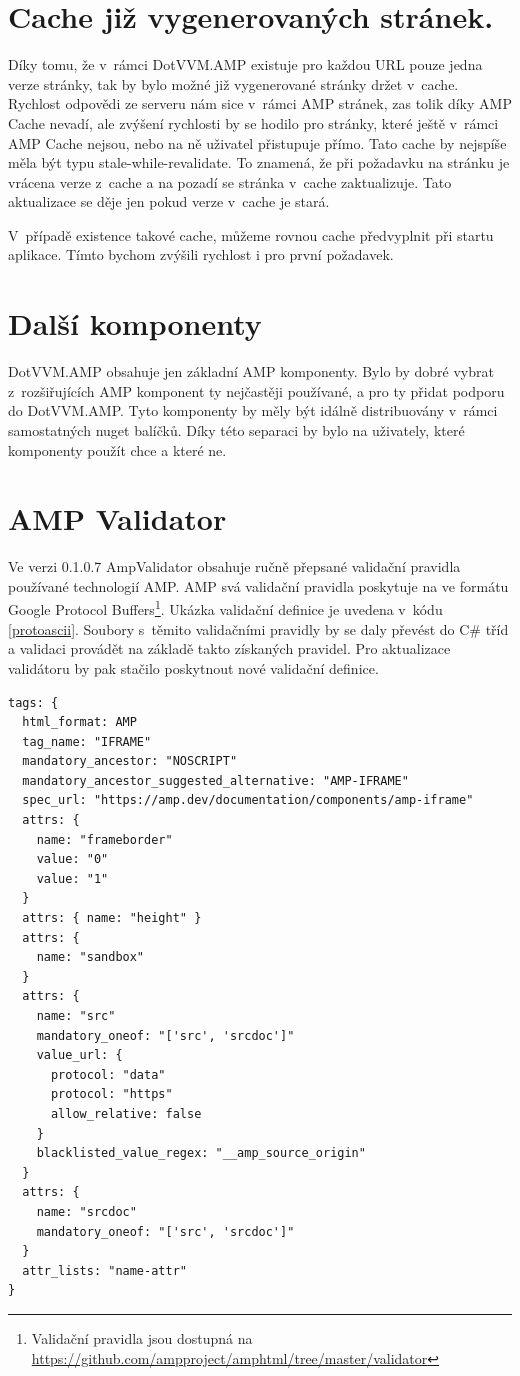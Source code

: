\section{Cache již vygenerovaných stránek.}
Díky tomu, že v~rámci DotVVM.AMP existuje pro každou URL pouze jedna verze stránky, tak by bylo možné již vygenerované stránky držet v~cache. Rychlost odpovědi ze serveru nám sice v~rámci AMP stránek, zas tolik díky AMP Cache nevadí, ale zvýšení rychlosti by se hodilo pro stránky, které ještě v~rámci AMP Cache nejsou, nebo na ně uživatel přistupuje přímo.
Tato cache by nejspíše měla být typu stale-while-revalidate. To znamená, že při požadavku na stránku je vrácena verze z~cache a na pozadí se stránka v~cache zaktualizuje. Tato aktualizace se děje jen pokud verze v~cache je stará.

V~případě existence takové cache, můžeme rovnou cache předvyplnit při startu aplikace. Tímto bychom zvýšili rychlost i pro první požadavek.

\section{Další komponenty}
DotVVM.AMP obsahuje jen základní AMP komponenty. Bylo by dobré vybrat z~rozšiřujících AMP komponent ty nejčastěji používané, a pro ty přidat podporu do DotVVM.AMP. Tyto komponenty by měly být idálně distribuovány v~rámci samostatných nuget balíčků. Díky této separaci by bylo na uživately, které komponenty použít chce a které ne.


\section{AMP Validator}
Ve verzi 0.1.0.7 AmpValidator obsahuje ručně přepsané validační pravidla používané technologií AMP. AMP svá validační pravidla poskytuje na ve formátu Google Protocol Buffers\footnote{Validační pravidla jsou dostupná na \url{https://github.com/ampproject/amphtml/tree/master/validator}}. Ukázka validační definice je uvedena v~kódu \ref{protoascii}\cite{validatorGit}.  Soubory s~těmito validačními pravidly by se daly převést do C\# tříd a validaci provádět na základě takto získaných pravidel. Pro aktualizace validátoru by pak stačilo poskytnout nové validační definice.

\begin{lstlisting}[language=html, caption=Ukázka části validačního pravidla pro iframe v~rámci protoascii souboru.,label=protoascii,captionpos=t]
tags: {
  html_format: AMP
  tag_name: "IFRAME"
  mandatory_ancestor: "NOSCRIPT"
  mandatory_ancestor_suggested_alternative: "AMP-IFRAME"
  spec_url: "https://amp.dev/documentation/components/amp-iframe"
  attrs: {
    name: "frameborder"
    value: "0"
    value: "1"
  }
  attrs: { name: "height" }
  attrs: {
    name: "sandbox"
  }
  attrs: {
    name: "src"
    mandatory_oneof: "['src', 'srcdoc']"
    value_url: {
      protocol: "data"
      protocol: "https"
      allow_relative: false
    }
    blacklisted_value_regex: "__amp_source_origin"
  }
  attrs: {
    name: "srcdoc"
    mandatory_oneof: "['src', 'srcdoc']"
  }
  attr_lists: "name-attr"
}
\end{lstlisting}

